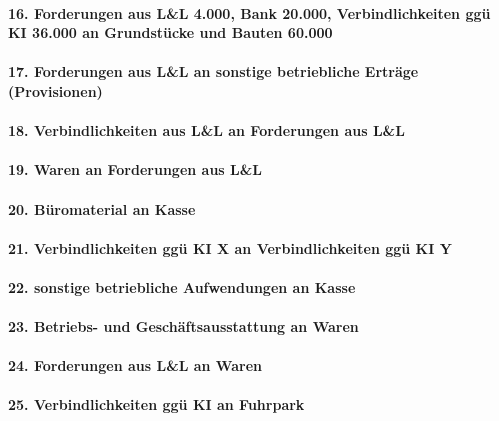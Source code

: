 \documentclass[paper=a4, fontsize=11pt]{scrartcl}
\numberwithin{equation}{section}
\numberwithin{figure}{section}
\numberwithin{table}{section}
\begin{document}
\paragraph{16. Forderungen aus L&L 4.000, Bank 20.000, Verbindlichkeiten ggü KI 36.000 an Grundstücke und Bauten 60.000}

\paragraph{17. Forderungen aus L&L an sonstige betriebliche Erträge (Provisionen)}

\paragraph{18. Verbindlichkeiten aus L&L an Forderungen aus L&L}

\paragraph{19. Waren an Forderungen aus L&L}

\paragraph{20. Büromaterial an Kasse}

\paragraph{21. Verbindlichkeiten ggü KI X an Verbindlichkeiten ggü KI Y}

\paragraph{22. sonstige betriebliche Aufwendungen an Kasse}

\paragraph{23. Betriebs- und Geschäftsausstattung an Waren}

\paragraph{24. Forderungen aus L&L an Waren}

\paragraph{25. Verbindlichkeiten ggü KI an Fuhrpark}
\end{document}
